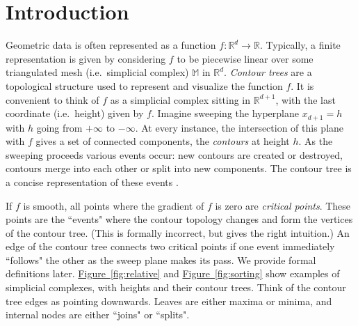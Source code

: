 \documentclass[11pt]{article}
\theoremstyle{definition}
\newcommand{\MM}{\mathbb{M}}
\newcommand{\RR}{\mathbb{R}}
\newcommand{\Fig}[1]{\hyperref[fig:#1]{Figure~\ref*{fig:#1}}} %
\begin{document}
\newpage
{}

\section{Introduction}

Geometric data is often represented as a function $f: \RR^d \to \RR$. Typically, a finite representation is given
by considering $f$ to be piecewise linear over some triangulated mesh (i.e.\ simplicial complex) $\MM$ in $\RR^d$.
\emph{Contour trees} are a topological structure used to represent and visualize
the function $f$. 
It is convenient to think of $f$ as a simplicial complex sitting in $\RR^{d+1}$,
with the last coordinate (i.e.\ height) given by $f$. Imagine sweeping the hyperplane $x_{d+1} = h$
with $h$ going from $+\infty$ to $-\infty$. At every instance, the intersection of this plane 
with $f$ gives a set of connected components, the \emph{contours} at height $h$. As the sweeping 
proceeds various events occur: new contours are created or destroyed, contours merge into each other or
split into new components. 
The contour tree is a concise representation of these events \cite{kobps-ctsssit-97,csa-cctad-03}.

If $f$ is smooth, all points where the gradient of $f$ is zero are \emph{critical points}.
These points are the ``events" where the contour topology changes and form the vertices of the contour tree. 
(This is formally incorrect, but gives the right intuition.)
An edge of the contour tree connects two critical points if one event immediately ``follows"
the other as the sweep plane makes its pass. We provide formal definitions later. 
\Fig{relative} and \Fig{sorting} 
show examples of simplicial complexes, with heights and their contour trees.
Think of the contour tree edges as pointing downwards. Leaves are either maxima or minima,
and internal nodes are either ``joins" or ``splits".

\end{document}
